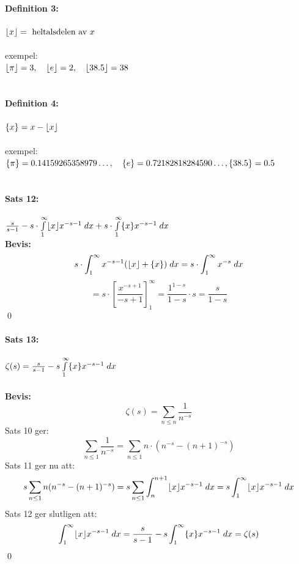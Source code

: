 \paragraph{Definition 3:} $\lfloor x\rfloor = \text{ heltalsdelen av } x$\\
\\
exempel:\\
$\lfloor\pi\rfloor = 3, \quad \lfloor e\rfloor = 2, \quad \lfloor38.5\rfloor = 38$\\
\\
\paragraph{Definition 4:} $\{x\} = x - \lfloor x\rfloor$\\
\\
exempel:\\
$\{\pi\} = 0.14159265358979 \ldots, \quad \{e\} = 0.72182818284590 \ldots, \{38.5\} = 0.5$\\
\\
\paragraph{Sats 12:} $\frac {s} {s - 1} - s \cdot \int\limits_1^\infty \lfloor x\rfloor x^{-s - 1} \; dx +
		s \cdot \int\limits_1^\infty \{x\} x^{-s - 1} \; dx$ \\
{\bf Bevis:}\\
\[
	s \cdot \int_1^\infty x^{-s - 1} (\lfloor x\rfloor + \{x\}) \; dx = s \cdot \int_1^\infty x^{-s} \; dx
\]
\[
	= s \cdot \left [
		\frac {x^{-s + 1}} {-s + 1}
	\right ]_1^\infty =
	\frac {1^{1 - s}} {1 - s} \cdot s = \frac {s} {1 - s}
\]
\hfill \qed
\\
\paragraph{Sats 13:} $\zeta(s) = \frac {s} {s - 1} - s \int\limits_1^\infty \{x\} x^{-s - 1} \; dx$\\
\\
{\bf Bevis:}\\
\[
	\zeta(s) = \sum_{n \leq n} \frac {1} {n^{-s}}
\]
Sats 10 ger:
\[
	\sum_{n \leq 1} \frac {1} {n^{-s}} = \sum_{n \leq 1} n \cdot (n^{-s} - (n + 1)^{-s})
\]
Sats 11 ger nu att:
\[
	s \sum_{n \leq 1} n (n^{-s} - (n + 1)^{-s}) = s \sum_{n \leq 1} \int_n^{n + 1} \lfloor x\rfloor x^{-s -1} \; dx =
		s \int_1^\infty \lfloor x\rfloor x^{-s - 1} \; dx
\]
Sats 12 ger slutligen att:
\[
	\int_1^\infty \lfloor x\rfloor x^{-s - 1} \; dx = \frac {s} {s - 1} - s \int_1^\infty \{x\} x^{-s - 1} \; dx = \zeta(s)
\]
\hfill \qed
\\

